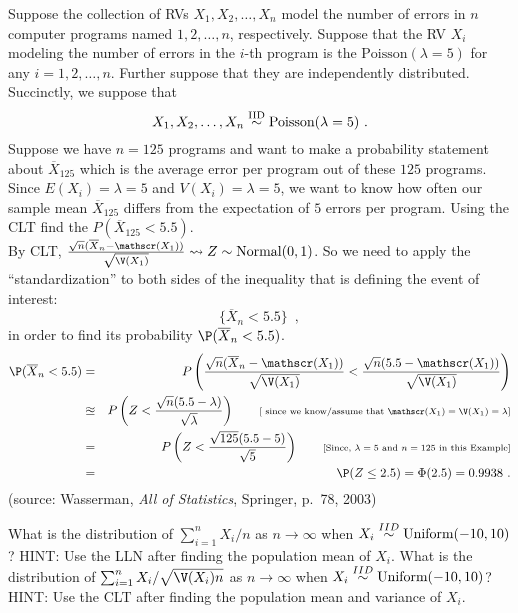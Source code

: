 \begin{ExerciseList}
\Exercise 
Suppose the collection of RVs $X_1,X_2, \ldots, X_n$ model the number of errors in $n$ computer programs named $1,2,\ldots,n$, respectively.  Suppose that the RV $X_i$ modeling the number of errors in the $i$-th program is the $\textrm{Poisson}(\lambda=5)$ for any $i=1,2,\ldots,n$.  Further suppose that they are independently distributed.  Succinctly, we suppose that 
\[
X_1,X_2,\ldots,X_n \overset{{\rm IID}}{\sim} \mbox{{\rm Poisson}}(\lambda=5) \ . 
\]
Suppose we have $n=125$ programs and want to make a probability statement about $\overline{X}_{125}$ which is the average error per program out of these $125$ programs.  Since $E(X_i) = \lambda=5$ and $V(X_i)=\lambda=5$, we want to know how often our sample mean $\overline{X}_{125}$ differs from the expectation of $5$ errors per program.  
Using the CLT find the $P(\overline{X}_{125} < 5.5)$.
\Answer
~\\
By CLT, $\frac{\sqrt{n}(\overline{X}_n - \E(X_1))}{\sqrt{\V(X_1)}} \rightsquigarrow Z \sim \mathrm{Normal}(0,1)$.  
So we need to apply the ``standardization'' to both sides of the inequality that is defining the event of interest:
$$\{\overline{X}_n < 5.5\} \enspace ,$$ 
in order to find its probability $\P(\overline{X}_n < 5.5)$.
~\\
\begin{eqnarray}
\P(\overline{X}_n < 5.5) 
&=& P \left( \frac{\sqrt{n}(\overline{X}_n - \E(X_1))}{\sqrt{\V(X_1)}} < \frac{\sqrt{n}(5.5-\E(X_1))}{\sqrt{\V(X_1)}} \right) \notag \\
&\approxeq& P \left( Z < \frac{\sqrt{n}(5.5-\lambda)}{\sqrt{\lambda}} \right) \qquad \text{{\scriptsize [
since we know/assume that $\E(X_1)=\V(X_1)=\lambda$]}} \notag \\
&=& P \left( Z < \frac{\sqrt{125}(5.5-5)}{\sqrt{5}} \right) \qquad \text{{\scriptsize [Since, $\lambda=5$ and $n=125$ in this Example]}} \notag \\
&=& \P(Z \leq 2.5) = \Phi(2.5) = 0.9938\ . \notag
\end{eqnarray}
(source: Wasserman, {\em All of Statistics}, Springer, p.~78, 2003)


\Exercise
What is the distribution of $\sum_{i=1}^n{X_i}/n$ as $n \to \infty$ when $X_i \overset{IID}{\sim} \mbox{{\rm Uniform}}(-10,10)$?
\Answer
HINT: Use the LLN after finding the population mean of $X_i$.
\Exercise
What is the distribution of $\sum_{i=1}^n{X_i}/\sqrt{\V(X_i)n}$ as $n \to \infty$ when $X_i \overset{IID}{\sim} \mbox{{\rm Uniform}}(-10,10)$?
\Answer
HINT: Use the CLT after finding the population mean and variance of $X_i$.
\end{ExerciseList}
